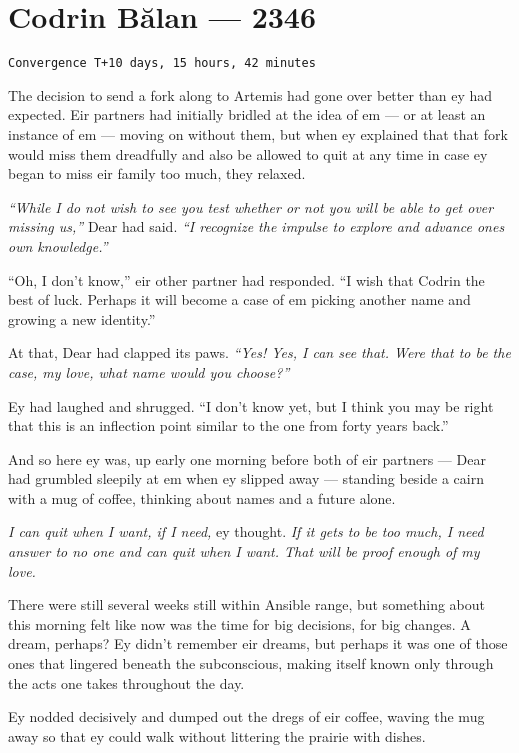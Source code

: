 \hypertarget{codrin-bux103lan-2346}{%
\chapter{Codrin Bălan — 2346}\label{codrin-bux103lan-2346}}

\begin{verbatim}
Convergence T+10 days, 15 hours, 42 minutes
\end{verbatim}

The decision to send a fork along to Artemis had gone over better than ey had expected. Eir partners had initially bridled at the idea of em — or at least an instance of em — moving on without them, but when ey explained that that fork would miss them dreadfully and also be allowed to quit at any time in case ey began to miss eir family too much, they relaxed.

\emph{``While I do not wish to see you test whether or not you will be able to get over missing us,''} Dear had said. \emph{``I recognize the impulse to explore and advance ones own knowledge.''}

``Oh, I don't know,'' eir other partner had responded. ``I wish that Codrin the best of luck. Perhaps it will become a case of em picking another name and growing a new identity.''

At that, Dear had clapped its paws. \emph{``Yes! Yes, I can see that. Were that to be the case, my love, what name would you choose?''}

Ey had laughed and shrugged. ``I don't know yet, but I think you may be right that this is an inflection point similar to the one from forty years back.''

And so here ey was, up early one morning before both of eir partners — Dear had grumbled sleepily at em when ey slipped away — standing beside a cairn with a mug of coffee, thinking about names and a future alone.

\emph{I can quit when I want, if I need,} ey thought. \emph{If it gets to be too much, I need answer to no one and can quit when I want. That will be proof enough of my love.}

There were still several weeks still within Ansible range, but something about this morning felt like now was the time for big decisions, for big changes. A dream, perhaps? Ey didn't remember eir dreams, but perhaps it was one of those ones that lingered beneath the subconscious, making itself known only through the acts one takes throughout the day.

Ey nodded decisively and dumped out the dregs of eir coffee, waving the mug away so that ey could walk without littering the prairie with dishes.

